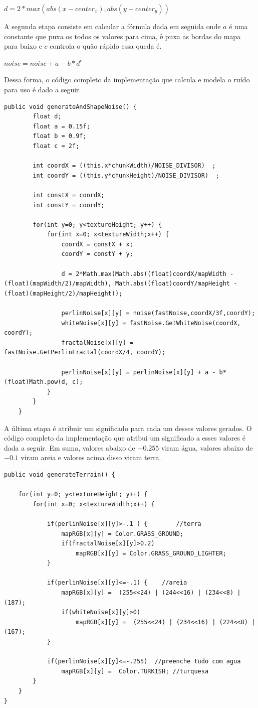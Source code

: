 \documentclass[12pt, 
openright, 
oneside, 
a4paper,    
brazil]{facom-ufu-abntex2}
\begin{document}
$d = 2*max(abs(x - center_x), abs(y - center_y))$

A segunda etapa consiste em calcular a fórmula dada em seguida \cite{NoiseRedBlob} onde $a$ é uma constante que puxa os todos os valores para cima, $b$ puxa as bordas do mapa para baixo e $c$ controla o quão rápido essa queda é.

$ noise = noise + a - b*d^c$

Dessa forma, o código completo da implementação que calcula e modela o ruído para uso é dado a seguir.

\begin{lstlisting}[caption=Implementação que gera e molda o ruído]
public void generateAndShapeNoise() {
		float d;
		float a = 0.15f;
		float b = 0.9f;
		float c = 2f;
		
		int coordX = ((this.x*chunkWidth)/NOISE_DIVISOR)  ;
		int coordY = ((this.y*chunkHeight)/NOISE_DIVISOR)  ;

		int constX = coordX;
		int constY = coordY;
		
		for(int y=0; y<textureHeight; y++) {
			for(int x=0; x<textureWidth;x++) {
				coordX = constX + x;
				coordY = constY + y;
				
				d = 2*Math.max(Math.abs((float)coordX/mapWidth - (float)(mapWidth/2)/mapWidth), Math.abs((float)coordY/mapHeight - (float)(mapHeight/2)/mapHeight));
				
				perlinNoise[x][y] = noise(fastNoise,coordX/3f,coordY);
				whiteNoise[x][y] = fastNoise.GetWhiteNoise(coordX, coordY); 
				fractalNoise[x][y] = fastNoise.GetPerlinFractal(coordX/4, coordY); 
				
				perlinNoise[x][y] = perlinNoise[x][y] + a - b*(float)Math.pow(d, c);
			}
		}
	}
\end{lstlisting}  

A última etapa é atribuir um significado para cada um desses valores gerados. O código completo da implementação que atribui um significado a esses valores é dada a seguir. Em suma, valores abaixo de $-0.255$  viram água, valores abaixo de $-0.1$ viram areia e valores acima disso viram terra.

\begin{lstlisting}[caption=Implementação que gera a textura final do terreno]
public void generateTerrain() {

	for(int y=0; y<textureHeight; y++) {
		for(int x=0; x<textureWidth;x++) {
			
			if(perlinNoise[x][y]>-.1 ) { 		//terra
				mapRGB[x][y] = Color.GRASS_GROUND;
				if(fractalNoise[x][y]>0.2)
					mapRGB[x][y] = Color.GRASS_GROUND_LIGHTER;
			}
			
			if(perlinNoise[x][y]<=-.1) {	//areia
				mapRGB[x][y] =  (255<<24) | (244<<16) | (234<<8) | (187);
				if(whiteNoise[x][y]>0)
					mapRGB[x][y] =  (255<<24) | (234<<16) | (224<<8) | (167);
			}
			
			if(perlinNoise[x][y]<=-.255)  //preenche tudo com agua
				mapRGB[x][y] = 	Color.TURKISH; //turquesa
		}
	}
}
\end{lstlisting}    
\end{document}
